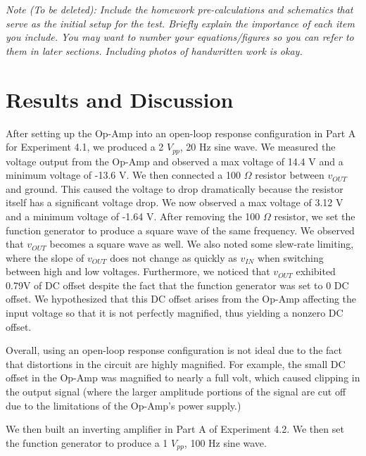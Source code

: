 \documentclass[10pt]{article}
\begin{document}
\medskip

\textit{Note (To be deleted): Include the homework pre-calculations and schematics that serve as the initial setup for the test. Briefly explain the importance of each item you include. You may want to number your equations/figures so you can refer to them in later sections. Including photos of handwritten work is okay.}

\section{Results and Discussion}

\qquad After setting up the Op-Amp into an open-loop response configuration in Part A for Experiment 4.1, we produced a 2 $V_{pp}$, 20 Hz sine wave. We measured the voltage output from the Op-Amp and observed a max voltage of 14.4 V and a minimum voltage of -13.6 V. We then connected a 100 $\Omega$ resistor between $v_{OUT}$ and ground. This caused the voltage to drop dramatically because the resistor itself has a significant voltage drop. We now observed a max voltage of 3.12 V and a minimum voltage of -1.64 V. After removing the 100 $\Omega$ resistor, we set the function generator to produce a square wave of the same frequency. We observed that $v_{OUT}$ becomes a square wave as well. We also noted some slew-rate limiting, where the slope of $v_{OUT}$ does not change as quickly as $v_{IN}$ when switching between high and low voltages. Furthermore, we noticed that $v_{OUT}$ exhibited 0.79V of DC offset despite the fact that the function generator was set to 0 DC offset. We hypothesized that this DC offset arises from the Op-Amp affecting the input voltage so that it is not perfectly magnified, thus yielding a nonzero DC offset. 

\quad Overall, using an open-loop response configuration is not ideal due to the fact that distortions in the circuit are highly magnified. For example, the small DC offset in the Op-Amp was magnified to nearly a full volt, which caused clipping in the output signal (where the larger amplitude portions of the signal are cut off due to the limitations of the Op-Amp's power supply.)

\quad We then built an inverting amplifier in Part A of Experiment 4.2. We then set the function generator to produce a 1 $V_{pp}$, 100 Hz sine wave. 
\end{document}

